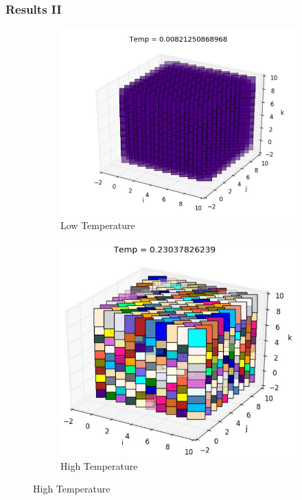 \documentclass{beamer}
\begin{document}
\begin{frame}
\frametitle{Results II}

\begin{figure}
\captionsetup[subfigure]{labelformat=empty}
\begin{subfigure}{0.45\textwidth}
  \centering
  \includegraphics[width=.8\linewidth]{fig/low_temp.jpg}
  \caption{Low Temperature}%
  \label{fig:low_tmp}
\end{subfigure}
\hspace*{\fill}
\begin{subfigure}{0.45\textwidth}
  \centering

  \includegraphics[width=.8\linewidth]{fig/high_tmp.jpg}
  \caption{High Temperature}%
  \label{fig:high_temp}
\end{subfigure}


\end{figure}
\end{frame}
\end{document}
